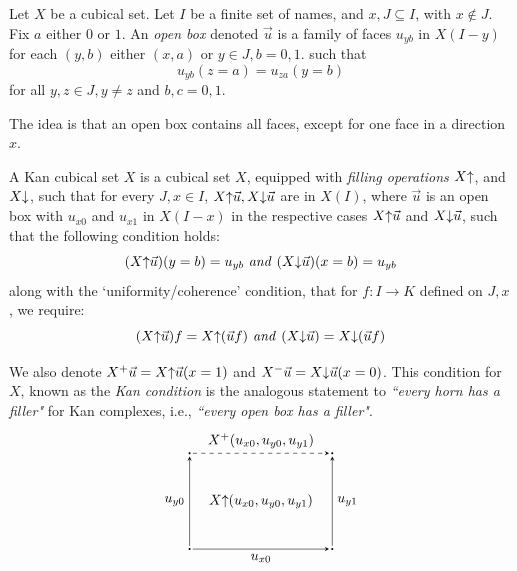 \begin{definition} 
  Let $X$ be a cubical set. Let $I$ be a finite set of names, and $x, J \subseteq I$, with $x \notin J$.
  Fix $a$ either $0$ or $1$.
  An \emph{open box} denoted $\vec{u}$ is a family of faces $u_{yb}$ in $X(I - y)$ for each $(y,b)$ either $(x,a)$ or $y \in J, b = 0,1$.
  such that \[u_{yb} (z = a) = u_{za}(y = b)\] for all $y, z \in J, y \neq z$ and $b, c = 0, 1$.
\end{definition}
The idea is that an open box contains all faces, except for one face in a direction $x$.

\begin{definition}
  A Kan cubical set $X$ is a cubical set $X$, equipped with \emph{filling operations} $X\mathord{\uparrow}$, and $X\mathord{\downarrow}$,
  such that for every $J,x \in I$, $X\mathord{\uparrow} \vec{u}, X \mathord{\downarrow} \vec{u}$ are in $X(I)$, where $\vec{u}$ is an open box
  with $u_{x0}$ and $u_{x1}$ in $X(I - x)$ in the respective cases $X \mathord{\uparrow} \vec{u}$ and $X \mathord{\downarrow} \vec{u}$, such that the following condition holds:
  \[
    (X \mathord{\uparrow} \vec{u})(y = b) = u_{yb} \text{ \emph{and} } (X \mathord{\downarrow} \vec{u})(x = b) = u_{yb}
  \]
  along with the `uniformity/coherence' condition, that for $f : I \to K$ defined on $J,x$, we require:
  \[
    (X \mathord{\uparrow} \vec{u}) f = X \mathord{\uparrow} (\vec{u} f) \text{\emph{ and }} (X \mathord{\downarrow} \vec{u}) = X \mathord{\downarrow} (\vec{u} f) \]
\end{definition}
We also denote $X^{+} \vec{u} = X \mathord{\uparrow} \vec{u} (x = 1)$ and $X^{-} \vec{u} = X \mathord{\downarrow} \vec{u} (x = 0)$.
This condition for $X$, known as the \emph{Kan condition} is the analogous statement to \emph{``every horn has a filler"} for Kan complexes, i.e., \emph{``every open box has a filler"}.
\[
\begin{tikzpicture}[scale=1.2, >=stealth]
  \node[circle, fill, inner sep=0.5pt] (A) at (0,0) {};
  \node[circle, fill, inner sep=0.5pt] (B) at (3,0) {};
  \node[circle, fill, inner sep=0.5pt] (C) at (0,2) {};
  \node[circle, fill, inner sep=0.5pt] (D) at (3,2) {};


  \node[circle, inner sep=1.5pt] (A) at (0,0) {};
  \node[circle, inner sep=1.5pt] (B) at (3,0) {};
  \node[circle, inner sep=1.5pt] (C) at (0,2) {};
  \node[circle, inner sep=1.5pt] (D) at (3,2) {};

  \draw[->] (A) -- node[below] {$u_{x0}$} (B);
  \draw[->] (A) -- node[left] {$u_{y0}$} (C);
  \draw[->] (B) -- node[right] {$u_{y1}$} (D);

  \draw[->, dashed] (C) -- node[above] {$X^{+} (u_{x0},u_{y0},u_{y1})$} (D);

  \node at (1.5,1) {$X \fillup (u_{x0},u_{y0},u_{y1})$};

\end{tikzpicture}
\]

